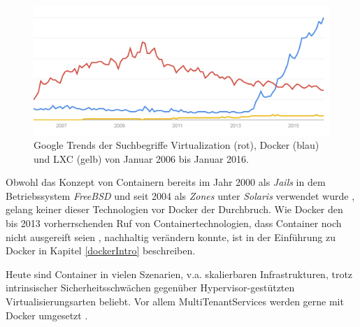 \documentclass[../main.tex]{subfiles}
\begin{document}
  \begin{figure}[h]
      \centering
      \includegraphics[width=1.0\textwidth]{./images/googletrend_dockerVirtualizationLXC.jpg}
      \caption{Google Trends der Suchbegriffe \glqq{}Virtualization\grqq{} (rot), \glqq{}Docker\grqq{} (blau) und \glqq{}LXC\grqq{} (gelb) von Januar 2006 bis Januar 2016\cite{googleTrends}.}
      \label{fig:overview_googleTrends}
  \end{figure}

  Obwohl das Konzept von Containern bereits im Jahr 2000 als \emph{Jails} in dem Betriebssystem \emph{FreeBSD} und seit 2004 als \emph{Zones} unter \emph{Solaris} verwendet wurde \cite{zonesReleasenotes}\cite{jailsReleasenotes}, gelang keiner dieser Technologien vor Docker der Durchbruch. Wie Docker den bis 2013 vorherrschenden Ruf von Containertechnologien, dass Container noch nicht ausgereift seien \cite[S.8]{containerVirtPerformance}, nachhaltig verändern konnte, ist in der Einführung zu Docker in Kapitel \ref{dockerIntro} beschreiben.

  Heute sind Container in vielen Szenarien, v.a. skalierbaren Infrastrukturen, trotz intrinsischer Sicherheitsschwächen gegenüber Hypervisor-gestützten Virtualisierungsarten beliebt. Vor allem \glspl{MultiTenantService} werden gerne mit Docker umgesetzt \cite[S.6]{dockerBook}\cite{dockerUnderstandingDocker}.

\end{document}
